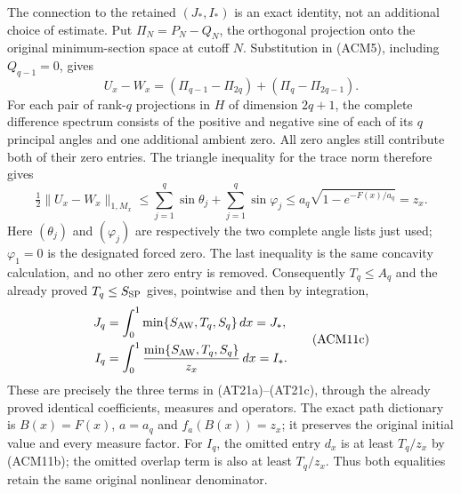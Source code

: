 The connection to the retained $(J_*,I_*)$ is an exact identity, not
an additional choice of estimate. Put $\Pi_N=P_N-Q_N$, the orthogonal
projection onto the original minimum-section space at cutoff $N$.
Substitution in (ACM5), including $Q_{q-1}=0$, gives
\[
 U_x-W_x=(\Pi_{q-1}-\Pi_{2q})+(\Pi_q-\Pi_{2q-1}).
\]
For each pair of rank-$q$ projections in $H$ of dimension $2q+1$,
the complete difference spectrum consists of the positive and negative
sine of each of its $q$ principal angles and one additional ambient
zero. All zero angles still contribute both of their zero entries.
The triangle inequality for the trace norm
therefore gives
\[
 \tfrac12\|U_x-W_x\|_{1,M_x}
 \leq\sum_{j=1}^q\sin\theta_j+\sum_{j=1}^q\sin\varphi_j
 \leq a_q\sqrt{1-e^{-F(x)/a_q}}=z_x.
 \tag{ACM11b}
\]
Here $(\theta_j)$ and $(\varphi_j)$ are respectively the two complete
angle lists just used; $\varphi_1=0$ is the designated forced zero.
The last inequality is the same concavity calculation, and no other
zero entry is removed. Consequently $T_q\leq A_q$ and the already
proved $T_q\leq S_{\rm SP}$ gives, pointwise and then by integration,
\[
\begin{split}
 J_q&=\int_0^1\min\{S_{\rm AW},T_q,S_q\}\,dx=J_*,\\
 I_q&=\int_0^1\frac{\min\{S_{\rm AW},T_q,S_q\}}{z_x}\,dx=I_*.
\end{split}
\tag{ACM11c}
\]
These are precisely the three terms in (AT21a)--(AT21c), through the
already proved identical coefficients, measures and operators.
The exact path dictionary is $B(x)=F(x)$, $a=a_q$ and $f_a(B(x))=z_x$;
it preserves the original initial value and every measure factor.
For $I_q$, the omitted entry $d_x$ is at least $T_q/z_x$ by
(ACM11b); the omitted overlap term is also at least $T_q/z_x$.
Thus both equalities retain the same original nonlinear denominator.

